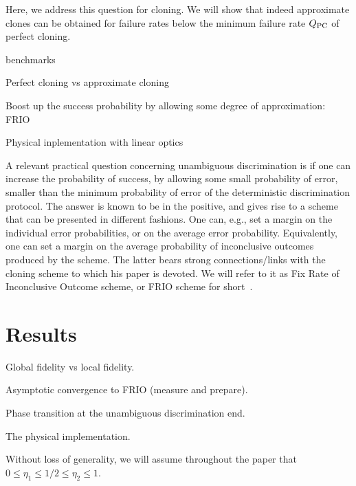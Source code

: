 \documentclass[aps,pra,twocolumn,showpacs]{revtex4-1}
\begin{document}
Here, we address this question for cloning. We will show that indeed approximate clones can be obtained for failure rates below the minimum failure rate $Q_{\rm PC}$ of perfect cloning.

benchmarks 

Perfect cloning vs approximate cloning 

Boost up the success probability by allowing some degree of approximation: FRIO 

Physical inplementation with linear optics 

\bigskip


A relevant practical question concerning unambiguous discrimination is if one can increase the probability of success, by allowing some small probability of error, smaller than the minimum probability of error of the deterministic discrimination protocol. The answer is known to be in the positive, and gives rise to a scheme that can be presented in different fashions. One can, e.g., set a margin on the individual error probabilities, or on the average error probability. Equivalently, one can set a margin on the average probability of inconclusive outcomes produced by the scheme.  The latter bears strong connections/links with the cloning scheme to which his paper is devoted. We will refer to it as Fix Rate of Inconclusive Outcome scheme, or FRIO scheme for short~\cite{FRIO}. 


\section{Results}

Global fidelity vs local fidelity.

Asymptotic convergence to FRIO (measure and prepare). 

Phase transition at the unambiguous discrimination end.

The physical implementation.

\bigskip
Without loss of generality, we will assume throughout the paper that $0\le\eta_1\le 1/2\le \eta_2\le 1$.
\bigskip
\end{document}
